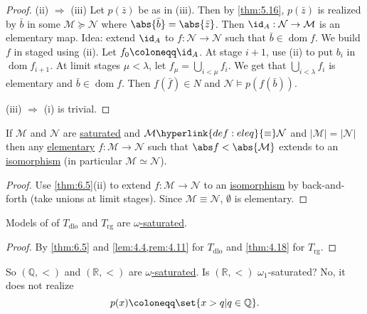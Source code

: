 \documentclass{article}
\let\models\vDash
\DeclareMathOperator{\dom}{dom}
\begin{document}
\begin{proof}
  (ii) $\Rightarrow$ (iii) Let $p(\bar z)$ be as in (iii). Then by \cref{thm:5.16}, $p(\bar z)$ is realized by $\bar b$ in some $\mathcal M \succcurlyeq \mathcal N$ where $\abs{\bar b} = \abs{\bar z}$. Then $\id_A: \mathcal{N} \to \mathcal{M}$ is an elementary map. Idea: extend $\id_A$ to $f: \mathcal{N} \to \mathcal{N}$ such that $\bar b \in \dom f$. We build $f$ in staged using (ii). Let $f_0 \coloneqq \id_A$. At stage $i+1$, use (ii) to put $b_i$ in $\dom f_{i+1}$. At limit stages  $\mu < \lambda$, let $f_\mu = \bigcup_{i < \mu} f_i$. We get that $\bigcup_{i < \lambda}f_i $ is elementary and $\bar b \in \dom f$. Then $f(\bar f) \in N$ and $\mathcal{N} \models p(f(\bar b))$.

  (iii) $\Rightarrow$ (i) is trivial.
\end{proof}
\begin{ncor}\label{cor:6.6}
  If $\mathcal{M}$ and $\mathcal{N}$ are \hyperlink{def:sat}{saturated} and $\mathcal{M} \hyperlink{def:eleq}{\equiv} \mathcal{N}$ and $|\mathcal{M}| = |\mathcal{N}|$ then any \hyperlink{def:elmap}{elementary} $f: \mathcal{M} \to \mathcal{N}$ such that $\abs f < \abs{\mathcal{M}}$ extends to an \hyperlink{def:iso}{isomorphism} (in particular \hyperlink{def:iso}{$\mathcal{M} \simeq \mathcal{N}$}).
\end{ncor}
\begin{proof}
  Use \cref{thm:6.5}(ii) to extend $f: \mathcal{M} \to \mathcal{N}$ to an \hyperlink{def:iso}{isomorphism} by back-and-forth (take unions at limit stages).
  Since $\mathcal M \equiv \mathcal N$, $\emptyset$ is elementary.
\end{proof}
\begin{ncor}\label{cor:6.7}
  Models of of $T_{\text{dlo}}$ and $T_{\text{rg}}$ are \hyperlink{def:sat}{$\omega$-saturated}.
\end{ncor}
\begin{proof}
  By \cref{thm:6.5} and \cref{lem:4.4,rem:4.11} for $T_{\text{dlo}}$ and \cref{thm:4.18} for $T_{\text{rg}}$.
\end{proof}

So $(\mathbb{Q}, <)$ and $(\mathbb{R}, <)$ are \hyperlink{def:sat}{$\omega$-saturated}.
Is $(\mathbb{R}, <)$ $\omega_1$-saturated? No, it does not realize
\begin{equation*}p(x) \coloneqq \set{x > q | q \in \mathbb{Q}}.\end{equation*}
\end{document}
